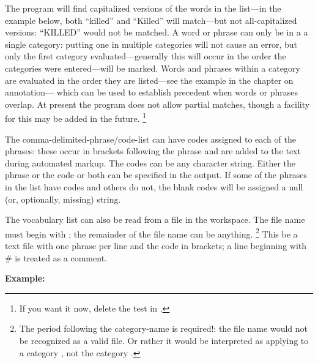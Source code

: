 \documentclass[letterpaper,10pt,english]{sphinxmanual}
\begin{document}
The program will find capitalized versions of the words in the list—in
the example below, both ``killed'' and ``Killed'' will match—but not
all-capitalized versions: ``KILLED'' would not be matched. A word or
phrase can only be in a a single category: putting one in multiple
categories will not cause an error, but only the first category
evaluated—generally this will occur in the order the categories were
entered—will be marked. Words and phrases within a category are
evaluated in the order they are listed—see the example in the chapter on annotation—
which can be used to establish precedent when words or
phrases overlap. At present the program does not allow partial matches,
though a facility for this may be added in the future. \footnote{
If you want it now, delete the test  in
.
}

The comma-delimited-phrase/code-list can have codes assigned to each of
the phrases: these occur in brackets following the phrase and are added
to the text during automated markup. The codes can be any character
string. Either the phrase or the code or both can be specified in the
output. If some of the phrases in the list have codes and others do not,
the blank codes will be assigned a null (or, optionally, missing)
string.

The vocabulary list can also be read from a file in the workspace. The
file name must begin with ; the remainder of
the file name can be anything. \footnote{
The period following the category-name is required!: the file name
 would not be recognized as a valid
 file. Or rather it would be interpreted as applying to a
category , not the category .
} This be a text file with one phrase
per line and the code in brackets; a line beginning with \# is treated as
a comment.

\textbf{Example:}
\begin{quote}




\end{quote}
\end{document}
